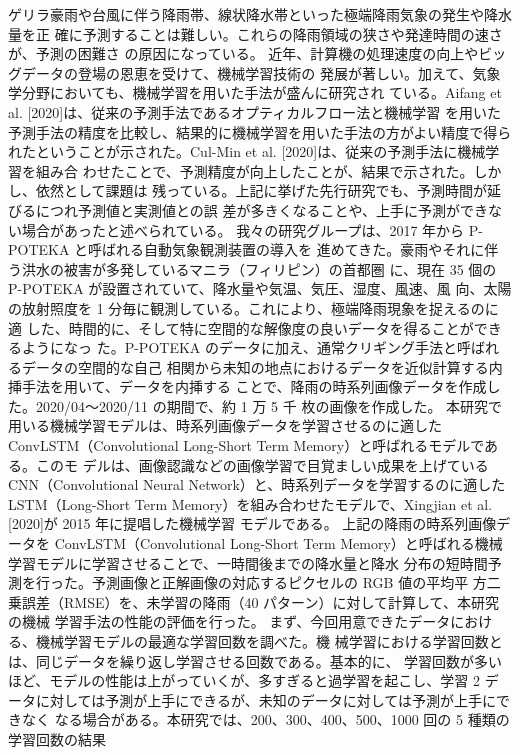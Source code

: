 ゲリラ豪雨や台風に伴う降雨帯、線状降水帯といった極端降雨気象の発生や降水量を正
確に予測することは難しい。これらの降雨領域の狭さや発達時間の速さが、予測の困難さ
の原因になっている。
近年、計算機の処理速度の向上やビッグデータの登場の恩恵を受けて、機械学習技術の
発展が著しい。加えて、気象学分野においても、機械学習を用いた手法が盛んに研究され
ている。Aifang et al. [2020]は、従来の予測手法であるオプティカルフロー法と機械学習
を用いた予測手法の精度を比較し、結果的に機械学習を用いた手法の方がよい精度で得ら
れたということが示された。Cul-Min et al. [2020]は、従来の予測手法に機械学習を組み合
わせたことで、予測精度が向上したことが、結果で示された。しかし、依然として課題は
残っている。上記に挙げた先行研究でも、予測時間が延びるにつれ予測値と実測値との誤
差が多きくなることや、上手に予測ができない場合があったと述べられている。
我々の研究グループは、2017 年から P-POTEKA と呼ばれる自動気象観測装置の導入を
進めてきた。豪雨やそれに伴う洪水の被害が多発しているマニラ（フィリピン）の首都圏
に、現在 35 個の P-POTEKA が設置されていて、降水量や気温、気圧、湿度、風速、風
向、太陽の放射照度を 1 分毎に観測している。これにより、極端降雨現象を捉えるのに適
した、時間的に、そして特に空間的な解像度の良いデータを得ることができるようになっ
た。P-POTEKA のデータに加え、通常クリギング手法と呼ばれるデータの空間的な自己
相関から未知の地点におけるデータを近似計算する内挿手法を用いて、データを内挿する
ことで、降雨の時系列画像データを作成した。2020/04～2020/11 の期間で、約 1 万 5 千
枚の画像を作成した。
本研究で用いる機械学習モデルは、時系列画像データを学習させるのに適した
ConvLSTM（Convolutional Long-Short Term Memory）と呼ばれるモデルである。このモ
デルは、画像認識などの画像学習で目覚ましい成果を上げている CNN（Convolutional
Neural Network）と、時系列データを学習するのに適した LSTM（Long-Short Term
Memory）を組み合わせたモデルで、Xingjian et al. [2020]が 2015 年に提唱した機械学習
モデルである。
上記の降雨の時系列画像データを ConvLSTM（Convolutional Long-Short Term
Memory）と呼ばれる機械学習モデルに学習させることで、一時間後までの降水量と降水
分布の短時間予測を行った。予測画像と正解画像の対応するピクセルの RGB 値の平均平
方二乗誤差（RMSE）を、未学習の降雨（40 パターン）に対して計算して、本研究の機械
学習手法の性能の評価を行った。
まず、今回用意できたデータにおける、機械学習モデルの最適な学習回数を調べた。機
械学習における学習回数とは、同じデータを繰り返し学習させる回数である。基本的に、
学習回数が多いほど、モデルの性能は上がっていくが、多すぎると過学習を起こし、学習
2
データに対しては予測が上手にできるが、未知のデータに対しては予測が上手にできなく
なる場合がある。本研究では、200、300、400、500、1000 回の 5 種類の学習回数の結果
